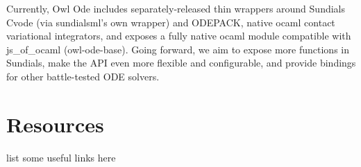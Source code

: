 Currently, Owl Ode includes separately-released thin wrappers around Sundials Cvode (via sundialsml's own wrapper) and ODEPACK, native ocaml contact variational integrators, and exposes a fully native ocaml module compatible with js\_of\_ocaml (owl-ode-base). Going forward, we aim to expose more functions in Sundials, make the API even more flexible and configurable, and provide bindings for other battle-tested ODE solvers.



\hypertarget{Resources}{%
\section{Resources}\label{resources}}

list some useful links here